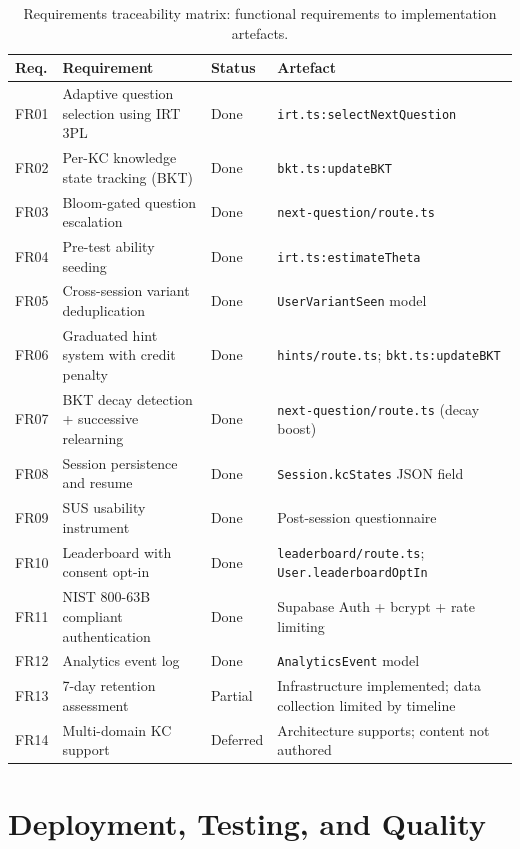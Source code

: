 \begin{table}[H]
\centering
\caption{Requirements traceability matrix: functional requirements to
implementation artefacts.}
\label{tab:traceability}
\renewcommand{\arraystretch}{1.2}
\begin{tabularx}{\textwidth}{lXlX}
\toprule
\textbf{Req.} & \textbf{Requirement} & \textbf{Status} & \textbf{Artefact} \\
\midrule
FR01 & Adaptive question selection using IRT 3PL & Done &
  \texttt{irt.ts:selectNextQuestion} \\
FR02 & Per-KC knowledge state tracking (BKT) & Done &
  \texttt{bkt.ts:updateBKT} \\
FR03 & Bloom-gated question escalation & Done &
  \texttt{next-question/route.ts} \\
FR04 & Pre-test ability seeding & Done &
  \texttt{irt.ts:estimateTheta} \\
FR05 & Cross-session variant deduplication & Done &
  \texttt{UserVariantSeen} model \\
FR06 & Graduated hint system with credit penalty & Done &
  \texttt{hints/route.ts}; \texttt{bkt.ts:updateBKT} \\
FR07 & BKT decay detection + successive relearning & Done &
  \texttt{next-question/route.ts} (decay boost) \\
FR08 & Session persistence and resume & Done &
  \texttt{Session.kcStates} JSON field \\
FR09 & SUS usability instrument & Done &
  Post-session questionnaire \\
FR10 & Leaderboard with consent opt-in & Done &
  \texttt{leaderboard/route.ts}; \texttt{User.leaderboardOptIn} \\
FR11 & NIST 800-63B compliant authentication & Done &
  Supabase Auth + bcrypt + rate limiting \\
FR12 & Analytics event log & Done &
  \texttt{AnalyticsEvent} model \\
FR13 & 7-day retention assessment & Partial &
  Infrastructure implemented; data collection limited by timeline \\
FR14 & Multi-domain KC support & Deferred &
  Architecture supports; content not authored \\
\bottomrule
\end{tabularx}
\end{table}

\section{Deployment, Testing, and Quality}
\label{sec:impl_ci}

